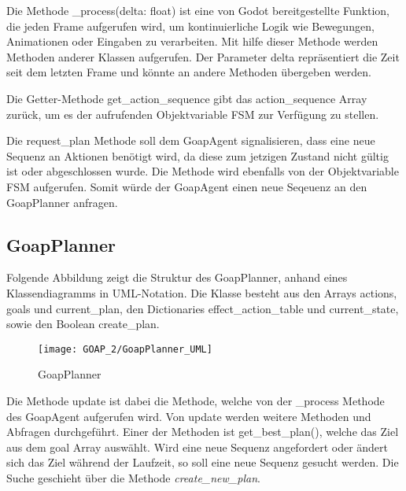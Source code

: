 Die Methode \_process(delta: float) ist eine von Godot bereitgestellte Funktion, die jeden Frame aufgerufen wird, um kontinuierliche Logik wie Bewegungen, Animationen oder Eingaben zu verarbeiten. Mit hilfe dieser Methode werden Methoden anderer Klassen aufgerufen. Der Parameter delta repräsentiert die Zeit seit dem letzten Frame und könnte an andere Methoden übergeben werden.



Die Getter-Methode get\_action\_sequence gibt das action\_sequence Array zurück, um es der aufrufenden Objektvariable FSM zur Verfügung zu stellen.

Die request\_plan Methode soll dem GoapAgent signalisieren, dass eine neue Sequenz an Aktionen benötigt wird, da diese zum jetzigen Zustand nicht gültig ist oder abgeschlossen wurde. Die Methode wird ebenfalls von der Objektvariable FSM aufgerufen. Somit würde der GoapAgent einen neue Seqeuenz an den GoapPlanner anfragen.

\subsection{GoapPlanner}

Folgende Abbildung zeigt die Struktur des GoapPlanner, anhand eines Klassendiagramms in UML-Notation. Die Klasse besteht aus den Arrays actions, goals und current\_plan, den Dictionaries effect\_action\_table und current\_state, sowie den Boolean create\_plan.

\begin{figure}[h]
  \centering
  \texttt{[image: GOAP\_2/GoapPlanner\_UML]}
	\captionsetup{justification=justified, format=plain}
  \caption{GoapPlanner}
  \label{GoapPlanner}
\end{figure}

Die Methode update ist dabei die Methode, welche von der \_process Methode des GoapAgent aufgerufen wird. Von update werden weitere  Methoden und Abfragen durchgeführt. Einer der Methoden ist get\_best\_plan(), welche das Ziel aus dem goal Array auswählt. Wird eine neue Sequenz angefordert oder ändert sich das Ziel während der Laufzeit, so soll eine neue Sequenz gesucht werden. Die Suche geschieht über die Methode \textit{create\_new\_plan}.



